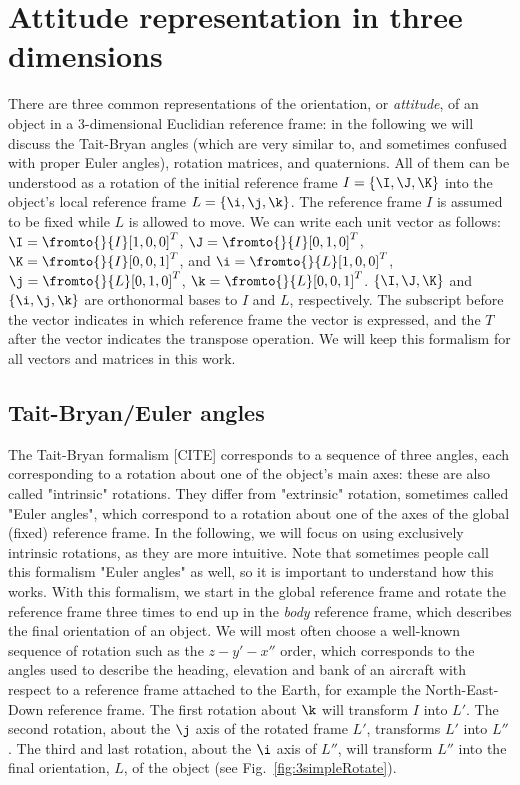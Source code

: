 \chapter{Attitude representation in three dimensions}
\label{sec:attituderepresentation}

There are three common representations of the orientation, or \textit{attitude}, of an object in a 3-dimensional Euclidian reference frame: in the following we will discuss the Tait-Bryan angles (which are very similar to, and sometimes confused with proper Euler angles), rotation matrices, and quaternions. All of them can be understood as a rotation of the initial reference frame $I = \{\I,\J,\K\}$ into the object's local reference frame $L = \{\i,\j,\k\}$. The reference frame $I$ is assumed to be fixed while $L$ is allowed to move. We can write each unit vector as follows: $\I = \fromto{}{I}[1,0,0]^T$, $\J = \fromto{}{I}[0,1,0]^T$, $\K = \fromto{}{I}[0,0,1]^T$, and $\i = \fromto{}{L}[1,0,0]^T$, $\j = \fromto{}{L}[0,1,0]^T$, $\k = \fromto{}{L}[0,0,1]^T$. $\{\I,\J,\K\}$ and $\{\i,\j,\k\}$ are  orthonormal bases to $I$ and $L$, respectively. The subscript before the vector indicates in which reference frame the vector is expressed, and the $T$ after the vector indicates the transpose operation. We will keep this formalism for all vectors and matrices in this work.

\section{Tait-Bryan/Euler angles}
\label{sec:Tait-Bryan}
The Tait-Bryan formalism [CITE] corresponds to a sequence of three angles, each corresponding to a rotation about one of the object's main axes: these are also called "intrinsic" rotations. They differ from "extrinsic" rotation, sometimes called "Euler angles", which correspond to a rotation about one of the axes of the global (fixed) reference frame. In the following, we will focus on using exclusively intrinsic rotations, as they are more intuitive. Note that sometimes people call this formalism "Euler angles" as well, so it is important to understand how this works.
With this formalism, we start in the global reference frame and rotate the reference frame three times to end up in the 
\textit{body} reference frame, which describes the final orientation of an object. We will most often choose a well-known sequence of rotation such as the $z-y'-x''$ order, which corresponds to the angles used to describe the heading, elevation and bank of an aircraft with respect to a reference frame attached to the Earth, for example the North-East-Down reference frame. The first rotation about $\k$ will transform $I$ into $L'$. The second rotation, about the $\j$ axis of the rotated frame $L'$, transforms $L'$ into $L''$. The third and last rotation, about the $\i$ axis of $L''$, will transform $L''$ into the final orientation, $L$, of the object (see Fig.~\ref{fig:3simpleRotate}).

